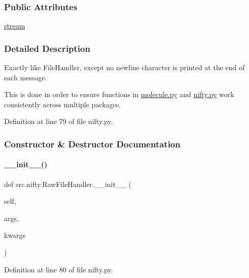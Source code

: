 \subsubsection*{Public Attributes}
\begin{DoxyCompactItemize}
\item 
\hyperlink{classsrc_1_1nifty_1_1RawFileHandler_a3031c89c30d8c07ec53e646b5002a229}{stream}
\end{DoxyCompactItemize}


\subsubsection{Detailed Description}
Exactly like File\+Handler, except no newline character is printed at the end of each message. 

This is done in order to ensure functions in \hyperlink{molecule_8py}{molecule.\+py} and \hyperlink{nifty_8py}{nifty.\+py} work consistently across multiple packages. 

Definition at line 79 of file nifty.\+py.



\subsubsection{Constructor \& Destructor Documentation}
\mbox{\label{classsrc_1_1nifty_1_1RawFileHandler_a7d457f855af1c55ac42a95b3c034d8d9}} 
\paragraph{\texorpdfstring{\+\_\+\+\_\+init\+\_\+\+\_\+()}{\_\_init\_\_()}}
{\footnotesize\ttfamily def src.\+nifty.\+Raw\+File\+Handler.\+\_\+\+\_\+init\+\_\+\+\_\+ (\begin{DoxyParamCaption}\item[{}]{self,  }\item[{}]{args,  }\item[{}]{kwargs }\end{DoxyParamCaption})}



Definition at line 80 of file nifty.\+py.



